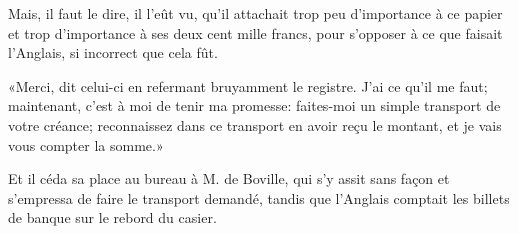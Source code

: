 Mais, il faut le dire, il l'eût vu, qu'il attachait trop peu d'importance à ce papier et trop d'importance à ses deux cent mille francs, pour s'opposer à ce que faisait l'Anglais, si incorrect que cela fût.

«Merci, dit celui-ci en refermant bruyamment le registre. J'ai ce qu'il me faut; maintenant, c'est à moi de tenir ma promesse: faites-moi un simple transport de votre créance; reconnaissez dans ce transport en avoir reçu le montant, et je vais vous compter la somme.»

Et il céda sa place au bureau à M. de Boville, qui s'y assit sans façon et s'empressa de faire le transport demandé, tandis que l'Anglais comptait les billets de banque sur le rebord du casier.




